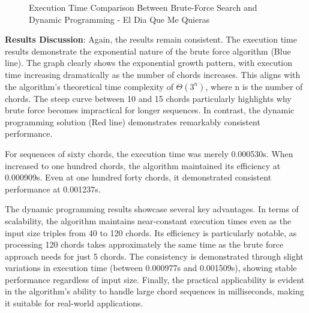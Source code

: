 \documentclass[conference]{IEEEtran}
\begin{document}
\begin{figure}[H]
    \centering
    \caption{Execution Time Comparison Between Brute-Force Search and Dynamic Programming - El Dia Que Me Quieras}
    \label{fig:execution-time-2}
\end{figure}

\textbf{Results Discussion}: Again, the results remain consistent. The execution time results demonstrate the exponential nature of the brute force algorithm (Blue line). 
The graph clearly shows the exponential growth pattern, with execution time increasing dramatically as the number of chords increases. This aligns with the algorithm's theoretical time complexity of \(\Theta(3^n)\), where n is the number of chords. The steep curve between 10 and 15 chords particularly highlights why brute force becomes impractical for longer sequences.
In contrast, the dynamic programming solution (Red line) demonstrates remarkably consistent performance.

For sequences of sixty chords, the execution time was merely 0.000530s. When increased to one hundred chords, the algorithm maintained its efficiency at 0.000909s. Even at one hundred forty chords, it demonstrated consistent performance at 0.001237s.

The dynamic programming results showcase several key advantages. In terms of scalability, the algorithm maintains near-constant execution times even as the input size triples from 40 to 120 chords. Its efficiency is particularly notable, as processing 120 chords takes approximately the same time as the brute force approach needs for just 5 chords. The consistency is demonstrated through slight variations in execution time (between 0.000977s and 0.001509s), showing stable performance regardless of input size. Finally, the practical applicability is evident in the algorithm's ability to handle large chord sequences in milliseconds, making it suitable for real-world applications.
\end{document}
